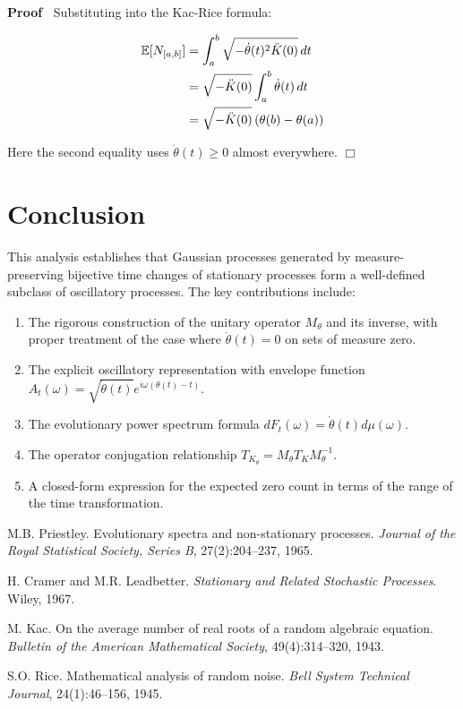 \documentclass{article}
\newenvironment{proof}{\noindent\textbf{Proof\ }}{\hspace*{\fill}$\Box$\medskip}
\begin{document}
\begin{proof}
  Substituting into the Kac-Rice formula:
  
  \begin{align}
    \mathbb{E} [N_{[a, b]}] & = \int_a^b \sqrt{- \dot{\theta} (t)^2  \ddot{K}
    (0)}  \hspace{0.17em} dt \\
    & = \sqrt{- \ddot{K} (0)}  \int_a^b \dot{\theta} (t)  \hspace{0.17em} dt
    \\
    & = \sqrt{- \ddot{K} (0)}  \hspace{0.17em} (\theta (b) - \theta (a)) 
  \end{align}
  
  Here the second equality uses $\dot{\theta} (t) \geq 0$ almost everywhere.
\end{proof}

\section{Conclusion}\label{sec:conclusion}

This analysis establishes that Gaussian processes generated by
measure-preserving bijective time changes of stationary processes form a
well-defined subclass of oscillatory processes. The key contributions include:
\begin{enumerate}
  \item The rigorous construction of the unitary operator $M_{\theta}$ and its
  inverse, with proper treatment of the case where $\dot{\theta} (t) = 0$ on
  sets of measure zero.
  
  \item The explicit oscillatory representation with envelope function $A_t
  (\omega) = \sqrt{\dot{\theta} (t)} e^{i \omega (\theta (t) - t)}$.
  
  \item The evolutionary power spectrum formula $dF_t (\omega) = \dot{\theta}
  (t) d \mu (\omega)$.
  
  \item The operator conjugation relationship $T_{K_{\theta}} = M_{\theta} T_K
  M_{\theta}^{- 1}$.
  
  \item A closed-form expression for the expected zero count in terms of the
  range of the time transformation.
\end{enumerate}
\begin{thebibliography}{99}
 M.B. Priestley. Evolutionary spectra and non-stationary processes. \textit{Journal of the Royal Statistical Society, Series B}, 27(2):204--237, 1965.

 H. Cramer and M.R. Leadbetter. \textit{Stationary and Related Stochastic Processes}. Wiley, 1967.

 M. Kac. On the average number of real roots of a random algebraic equation. \textit{Bulletin of the American Mathematical Society}, 49(4):314--320, 1943.

 S.O. Rice. Mathematical analysis of random noise. \textit{Bell System Technical Journal}, 24(1):46--156, 1945.
\end{thebibliography}
\end{document}
